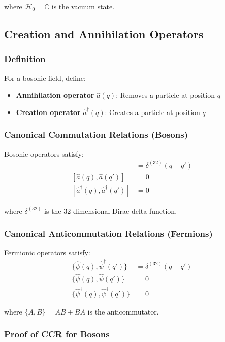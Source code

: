 where $\mathcal{H}_0 = \mathbb{C}$ is the vacuum state.

\subsection{Creation and Annihilation Operators}

\subsubsection{Definition}

For a bosonic field, define:
\begin{itemize}
\item \textbf{Annihilation operator} $\hat{a}(q)$: Removes a particle at position $q$
\item \textbf{Creation operator} $\hat{a}^{\dagger}(q)$: Creates a particle at position $q$
\end{itemize}

\subsubsection{Canonical Commutation Relations (Bosons)}

Bosonic operators satisfy:
\begin{align}
[\hat{a}(q), \hat{a}^{\dagger}(q')] &= \delta^{(32)}(q - q') \\
[\hat{a}(q), \hat{a}(q')] &= 0 \\
[\hat{a}^{\dagger}(q), \hat{a}^{\dagger}(q')] &= 0
\end{align}

where $\delta^{(32)}$ is the 32-dimensional Dirac delta function.

\subsubsection{Canonical Anticommutation Relations (Fermions)}

Fermionic operators satisfy:
\begin{align}
\{\hat{\psi}(q), \hat{\psi}^{\dagger}(q')\} &= \delta^{(32)}(q - q') \\
\{\hat{\psi}(q), \hat{\psi}(q')\} &= 0 \\
\{\hat{\psi}^{\dagger}(q), \hat{\psi}^{\dagger}(q')\} &= 0
\end{align}

where $\{A, B\} = AB + BA$ is the anticommutator.

\subsubsection{Proof of CCR for Bosons}

